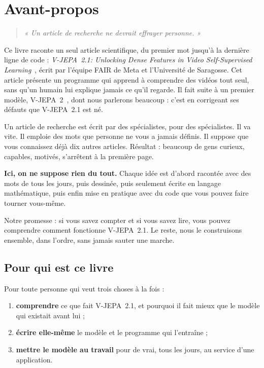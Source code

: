 \chapter*{Avant-propos}

\begin{quote}
\itshape « Un article de recherche ne devrait effrayer personne. »
\end{quote}

Ce livre raconte un seul article scientifique, du premier mot jusqu'à la
dernière ligne de code : \emph{V-JEPA~2.1: Unlocking Dense Features in Video
Self-Supervised Learning}~\parencite{murlabadia2026vjepa21}, écrit par
l'équipe FAIR de Meta et l'Université de Saragosse. Cet article présente un
programme qui apprend à comprendre des vidéos tout seul, sans qu'un humain
lui explique jamais ce qu'il regarde. Il fait suite à un premier modèle,
V-JEPA~2~\parencite{assran2025vjepa2}, dont nous parlerons beaucoup : c'est
en corrigeant ses défauts que V-JEPA~2.1 est né.

Un article de recherche est écrit par des spécialistes, pour des
spécialistes. Il va vite. Il emploie des mots que personne ne vous a jamais
définis. Il suppose que vous connaissez déjà dix autres articles. Résultat :
beaucoup de gens curieux, capables, motivés, s'arrêtent à la première page.

\textbf{Ici, on ne suppose rien du tout.} Chaque idée est d'abord racontée
avec des mots de tous les jours, puis dessinée, puis seulement écrite en
langage mathématique, puis enfin mise en pratique avec du code que vous
pouvez faire tourner vous-même.

\begin{enclair}
Notre promesse : si vous savez compter et si vous savez lire, vous pouvez
comprendre comment fonctionne V-JEPA~2.1. Le reste, nous le construisons
ensemble, dans l'ordre, sans jamais sauter une marche.
\end{enclair}

\section*{Pour qui est ce livre}

Pour toute personne qui veut trois choses à la fois :

\begin{enumerate}
  \item \textbf{comprendre} ce que fait V-JEPA~2.1, et pourquoi il fait
        mieux que le modèle qui existait avant lui ;
  \item \textbf{écrire elle-même} le modèle et le programme qui l'entraîne ;
  \item \textbf{mettre le modèle au travail} pour de vrai, tous les jours,
        au service d'une application.
\end{enumerate}

